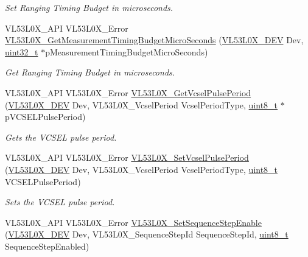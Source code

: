 \begin{DoxyCompactItemize}
\begin{DoxyCompactList}\small\item\em Set Ranging Timing Budget in microseconds. \end{DoxyCompactList}\item 
V\+L53\+L0\+X\+\_\+\+A\+PI V\+L53\+L0\+X\+\_\+\+Error \hyperlink{group__VL53L0X__parameters__group_ga567e1870afa4cd7b050f2eb807168e1c}{V\+L53\+L0\+X\+\_\+\+Get\+Measurement\+Timing\+Budget\+Micro\+Seconds} (\hyperlink{group__VL53L0X__platform__group_ga2d6405308b1dd524b462f1b8fb97d167}{V\+L53\+L0\+X\+\_\+\+D\+EV} Dev, \hyperlink{vl53l0x__types_8h_a435d1572bf3f880d55459d9805097f62}{uint32\+\_\+t} $\ast$p\+Measurement\+Timing\+Budget\+Micro\+Seconds)
\begin{DoxyCompactList}\small\item\em Get Ranging Timing Budget in microseconds. \end{DoxyCompactList}\item 
V\+L53\+L0\+X\+\_\+\+A\+PI V\+L53\+L0\+X\+\_\+\+Error \hyperlink{group__VL53L0X__parameters__group_ga459e0031cf69d5eee71cb46bc8a3daec}{V\+L53\+L0\+X\+\_\+\+Get\+Vcsel\+Pulse\+Period} (\hyperlink{group__VL53L0X__platform__group_ga2d6405308b1dd524b462f1b8fb97d167}{V\+L53\+L0\+X\+\_\+\+D\+EV} Dev, V\+L53\+L0\+X\+\_\+\+Vcsel\+Period Vcsel\+Period\+Type, \hyperlink{vl53l0x__types_8h_aba7bc1797add20fe3efdf37ced1182c5}{uint8\+\_\+t} $\ast$p\+V\+C\+S\+E\+L\+Pulse\+Period)
\begin{DoxyCompactList}\small\item\em Gets the V\+C\+S\+EL pulse period. \end{DoxyCompactList}\item 
V\+L53\+L0\+X\+\_\+\+A\+PI V\+L53\+L0\+X\+\_\+\+Error \hyperlink{group__VL53L0X__parameters__group_ga64ade1f2ee420b6a7b55b744cc8e06f0}{V\+L53\+L0\+X\+\_\+\+Set\+Vcsel\+Pulse\+Period} (\hyperlink{group__VL53L0X__platform__group_ga2d6405308b1dd524b462f1b8fb97d167}{V\+L53\+L0\+X\+\_\+\+D\+EV} Dev, V\+L53\+L0\+X\+\_\+\+Vcsel\+Period Vcsel\+Period\+Type, \hyperlink{vl53l0x__types_8h_aba7bc1797add20fe3efdf37ced1182c5}{uint8\+\_\+t} V\+C\+S\+E\+L\+Pulse\+Period)
\begin{DoxyCompactList}\small\item\em Sets the V\+C\+S\+EL pulse period. \end{DoxyCompactList}\item 
V\+L53\+L0\+X\+\_\+\+A\+PI V\+L53\+L0\+X\+\_\+\+Error \hyperlink{group__VL53L0X__parameters__group_gab8893aac301ab753e99d3245753b4294}{V\+L53\+L0\+X\+\_\+\+Set\+Sequence\+Step\+Enable} (\hyperlink{group__VL53L0X__platform__group_ga2d6405308b1dd524b462f1b8fb97d167}{V\+L53\+L0\+X\+\_\+\+D\+EV} Dev, V\+L53\+L0\+X\+\_\+\+Sequence\+Step\+Id Sequence\+Step\+Id, \hyperlink{vl53l0x__types_8h_aba7bc1797add20fe3efdf37ced1182c5}{uint8\+\_\+t} Sequence\+Step\+Enabled)

\end{DoxyCompactItemize}
